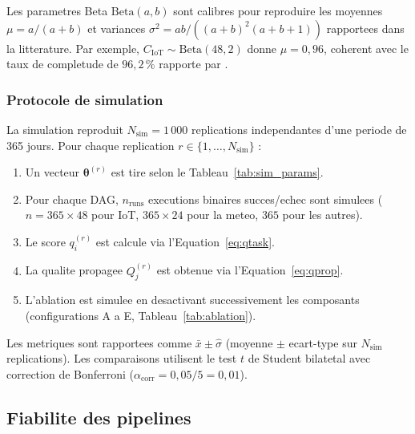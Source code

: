 \documentclass[12pt,a4paper]{article}
\theoremstyle{plain}
\theoremstyle{definition}
\theoremstyle{remark}
\begin{document}
	Les parametres Beta $\text{Beta}(a,b)$ sont calibres pour reproduire
	les moyennes $\mu = a/(a+b)$ et variances $\sigma^2 = ab/((a+b)^2(a+b+1))$
	rapportees dans la litterature. Par exemple, $C_{\text{IoT}} \sim \text{Beta}(48,2)$
	donne $\mu = 0{,}96$, coherent avec le taux de completude de
	$96{,}2\,\%$ rapporte par \cite{iot_review_2025}.
	
	\subsubsection{Protocole de simulation}
	
	La simulation reproduit $N_{\text{sim}} = 1\,000$ replications
	independantes d'une periode de 365 jours.
	Pour chaque replication $r \in \{1,\ldots,N_{\text{sim}}\}$ :
	
	\begin{enumerate}[leftmargin=1.5em, noitemsep]
		\item Un vecteur $\bm{\theta}^{(r)}$ est tire selon le
		Tableau~\ref{tab:sim_params}.
		\item Pour chaque DAG, $n_{\text{runs}}$ executions binaires
		succes/echec sont simulees ($n = 365 \times 48$ pour IoT,
		$365 \times 24$ pour la meteo, $365$ pour les autres).
		\item Le score $q_i^{(r)}$ est calcule via l'Equation~\eqref{eq:qtask}.
		\item La qualite propagee $Q_j^{(r)}$ est obtenue via
		l'Equation~\eqref{eq:qprop}.
		\item L'ablation est simulee en desactivant successivement les
		composants (configurations A a E, Tableau~\ref{tab:ablation}).
	\end{enumerate}
	
	Les metriques sont rapportees comme $\bar x \pm \hat\sigma$
	(moyenne $\pm$ ecart-type sur $N_{\text{sim}}$ replications).
	Les comparaisons utilisent le test $t$ de Student bilatetal avec
	correction de Bonferroni ($\alpha_{\text{corr}} = 0{,}05/5 = 0{,}01$).
	
	\subsection{Fiabilite des pipelines}
	
\end{document}
